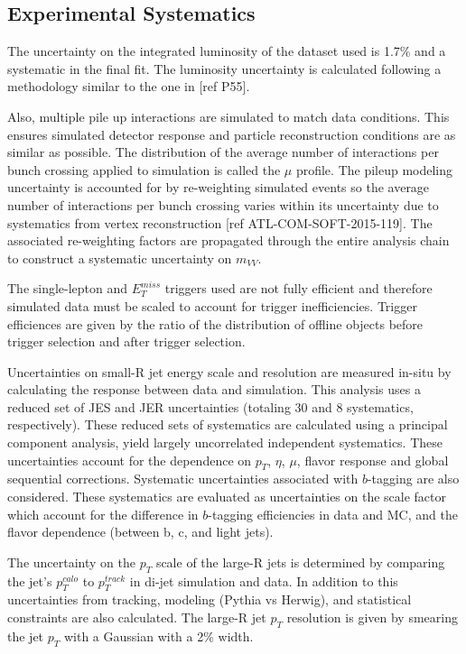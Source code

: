 \subsection{Experimental Systematics}
The uncertainty on the integrated luminosity of the dataset used is 1.7\% and a systematic in the final fit. The luminosity uncertainty is calculated following a methodology similar to the one in [ref P55]. 

Also, multiple pile up interactions are simulated to match data conditions. This ensures simulated detector response and particle reconstruction conditions are as similar as possible. The distribution of the average number of interactions per bunch crossing applied to simulation is called the $\mu$ profile. The pileup modeling uncertainty is accounted for by re-weighting simulated events so the average number of interactions per bunch crossing varies within its uncertainty due to systematics from vertex reconstruction [ref ATL-COM-SOFT-2015-119]. The associated re-weighting factors are propagated through the entire analysis chain to construct a systematic uncertainty on $m_{VV}$.

The single-lepton and $E_{T}^{miss}$ triggers used are not fully efficient and therefore simulated data must be scaled to account for trigger inefficiencies. Trigger efficiences are given by the ratio of the distribution of offline objects before trigger selection and after trigger selection. 

Uncertainties on small-R jet energy scale and resolution are measured in-situ by calculating the response between data and simulation. This analysis uses a reduced set of JES and JER uncertainties (totaling 30 and 8 systematics, respectively). These reduced sets of systematics are calculated using a principal component analysis, yield largely uncorrelated independent systematics. These uncertainties account for the dependence on $p_{T}$, $\eta$, $\mu$, flavor response and global sequential corrections. Systematic uncertainties associated with $b$-tagging are also considered. These systematics are evaluated as uncertainties on the scale factor which account for the difference in $b$-tagging efficiencies in data and MC, and the flavor dependence (between b, c, and light jets). 

The uncertainty on the $p_{T}$ scale of the large-R jets is determined by comparing the jet's $p_{T}^{calo}$ to $p_{T}^{track}$ in di-jet simulation and data. In addition to this uncertainties from tracking, modeling (Pythia vs Herwig), and statistical constraints are also calculated. The large-R jet $p_{T}$ resolution is given by smearing the jet $p_{T}$ with a Gaussian with a 2\% width.

